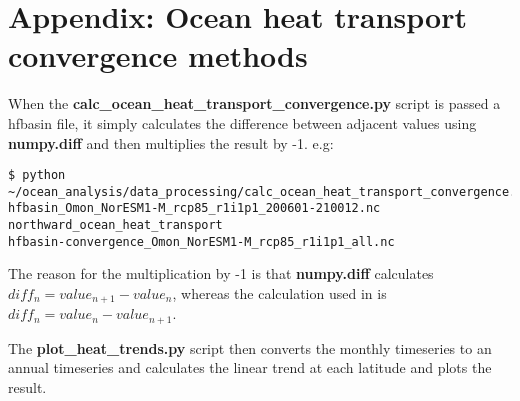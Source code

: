 \section{Appendix: Ocean heat transport convergence methods}

When the \textbf{calc_ocean_heat_transport_convergence.py} script is passed a hfbasin file, it simply calculates the difference between adjacent values using \textbf{numpy.diff} and then multiplies the result by -1. e.g:

\begin{verbatim}
$ python ~/ocean_analysis/data_processing/calc_ocean_heat_transport_convergence.py
hfbasin_Omon_NorESM1-M_rcp85_r1i1p1_200601-210012.nc
northward_ocean_heat_transport
hfbasin-convergence_Omon_NorESM1-M_rcp85_r1i1p1_all.nc
\end{verbatim}

The reason for the multiplication by -1 is that \textbf{numpy.diff} calculates $diff_{n} = value_{n+1} - value_{n}$, whereas the calculation used in \citet{Nummelin_2017} is $diff_{n} = value_{n} - value_{n+1}$.    

The \textbf{plot_heat_trends.py} script then converts the monthly timeseries to an annual timeseries and calculates the linear trend at each latitude and plots the result. 